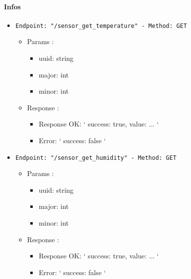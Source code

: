 \paragraph{Infos}

\begin{itemize}
  \item \texttt{Endpoint: "/sensor_get_temperature" -  Method: GET}
  \begin{itemize} 
    \item Params :
    \begin{itemize}
      \item uuid: string
      \item major: int
      \item minor: int
    \end{itemize}

    \item Response : 
    \begin{itemize}
      \item Response OK: `{ success: true, value: ... }`
      \item Error: `{ success: false }`
    \end{itemize}
  \end{itemize}
\end{itemize}

\begin{itemize}
  \item \texttt{Endpoint: "/sensor_get_humidity" -  Method: GET}
  \begin{itemize} 
    \item Params :
    \begin{itemize}
      \item uuid: string
      \item major: int
      \item minor: int
    \end{itemize}

    \item Response : 
    \begin{itemize}
      \item Response OK: `{ success: true, value: ... }`
      \item Error: `{ success: false }`
    \end{itemize}
  \end{itemize}
\end{itemize}

